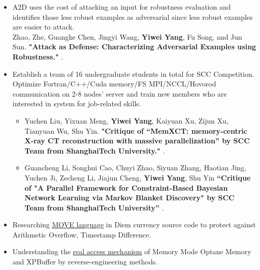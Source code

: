 \documentclass{resume}
\newcommand{\en}[1]{#1}
\newcommand{\zh}[1]{}
\begin{document}
\en{}
\zh{\datedsubsection{\textbf{\href{http://s3l.shanghaitech.edu.cn/}{上海科技大学系统}\href{https://toast-lab.gitee.io/}{实验室}}}{2019/07 -- 2021/06}}
\en{}
\zh{\role{本科生科研}{实习}}
\begin{itemize}
      \item \small{ \en{A2D uses the cost of attacking an input for robustness evaluation and identifies those less robust examples as adversarial since less robust examples are easier to attack.}
      \zh{A2D使用攻击输入的成本来进行鲁棒性评估，并将那些鲁棒性较差的例子确定为对抗性，因为鲁棒性较差的例子更容易被攻击。}}\\
      Zhao, Zhe, Guangke Chen, Jingyi Wang, \textbf{Yiwei Yang}, Fu Song, and Jun Sun. \textbf{"Attack as Defense: Characterizing Adversarial Examples using Robustness."}  .
            
      \item \small{\en{Establish a team of 16 undergraduate students in total for SCC Competition. Optimize Fortran/C++/Cuda memory/FS MPI/NCCL/Hovorod communication on 2-8 nodes' server and train new members who are interested in system for job-related skills.}\zh{建立一支由16名本科生组成的队伍参加SCC竞赛。在2-8个节点的服务器上优化Fortran/C++/Cuda内存/FS MPI/NCCL/Hovorod通信，并培训对系统感兴趣的新成员，以获得与工作有关的技能。}} \begin{itemize}
            \item Yuchen Liu, Yixuan Meng, \textbf{Yiwei Yang}, Kaiyuan Xu, Zijun Xu, Tianyuan Wu, Shu Yin. \textbf{"Critique of “MemXCT: memory-centric X-ray CT reconstruction with massive parallelization” by SCC Team from ShanghaiTech University."}  .
            \item Guancheng Li, Songhui Cao, Chuyi Zhao, Siyuan Zhang, Haotian Jing, Yuchen Ji, Zecheng Li, Jiajun Cheng, \textbf{Yiwei Yang}, Shu Yin \textbf{“Critique of "A Parallel Framework for Constraint-Based Bayesian Network Learning via Markov Blanket Discovery" by SCC Team from ShanghaiTech University”}  .
            \end{itemize}
      \item \en{Researching \href{https://github.com/LEAFERx/movable}{MOVE language} in Diem currency source code to protect against Arithmetic Overflow, Timestamp Difference.}
            \zh{研究Diem源码中的\href{https://github.com/LEAFERx/movable}{MOVE language}，提高抵御时间戳攻击、整数溢出等的安全性。}
      \item \en{Understanding the \href{https://github.com/victoryang00/pmemable}{real access mechanism} of Memory Mode Optane Memory and XPBuffer by reverse-engineering methods.}
            \zh{通过逆向工程的相关手段去理解在memory mode 下傲腾内存以及XPBuffer的\href{https://github.com/victoryang00/pmemable}{内存置换算法逻辑}。}
\end{itemize}
\end{document}
